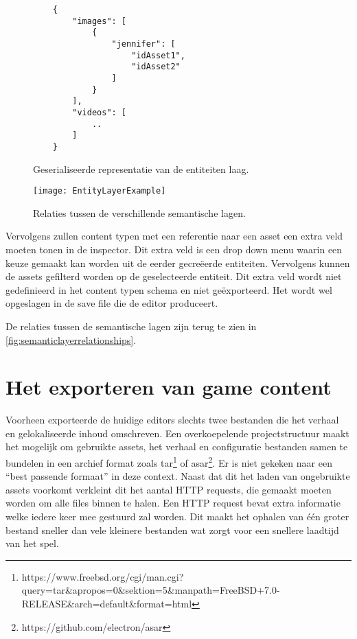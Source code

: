 \begin{figure}[htb]
    \centering
    \lstset{language=JavaScript}
    \begin{lstlisting}
    {
        "images": [
            {
                "jennifer": [
                    "idAsset1",
                    "idAsset2"
                ]
            }
        ],
        "videos": [
            ..
        ]
    }          
    \end{lstlisting}
    \caption{Geserialiseerde representatie van de entiteiten laag.}
    \label{lst:serializedentitylayer}
\end{figure}

\begin{wrapfigure}{r}{0.42\textwidth}
    \texttt{[image: EntityLayerExample]}
    \caption{Relaties tussen de verschillende semantische lagen.}
    \label{fig:semanticlayerrelationships}
    \centering
\end{wrapfigure}

Vervolgens zullen content typen met een referentie naar een asset een extra veld moeten tonen in de inspector. Dit extra veld is een drop down menu waarin een keuze gemaakt kan worden uit de eerder gecreëerde entiteiten. Vervolgens kunnen de assets gefilterd worden op de geselecteerde entiteit. Dit extra veld wordt niet gedefinieerd in het content typen schema en niet geëxporteerd. Het wordt wel opgeslagen in de save file die de editor produceert.

De relaties tussen de semantische lagen zijn terug te zien in \autoref{fig:semanticlayerrelationships}.

\clearpage
\section{Het exporteren van game content}
\label{sec:exportproces}
Voorheen exporteerde de huidige editors slechts twee bestanden die het verhaal en gelokaliseerde inhoud omschreven. Een overkoepelende projectstructuur maakt het mogelijk om gebruikte assets, het verhaal en configuratie bestanden samen te bundelen in een archief format zoals tar\footnote{https://www.freebsd.org/cgi/man.cgi?query=tar\&apropos=0\&sektion=5\&manpath=FreeBSD+7.0-RELEASE\&arch=default\&format=html} of asar\footnote{https://github.com/electron/asar}. Er is niet gekeken naar een “best passende formaat” in deze context. Naast dat dit het laden van ongebruikte assets voorkomt verkleint dit het aantal HTTP requests, die gemaakt moeten worden om alle files binnen te halen. Een HTTP request bevat extra informatie welke iedere keer mee gestuurd zal worden\cite{Fielding1999}. Dit maakt het ophalen van één groter bestand sneller dan vele kleinere bestanden wat zorgt voor een snellere laadtijd van het spel.

